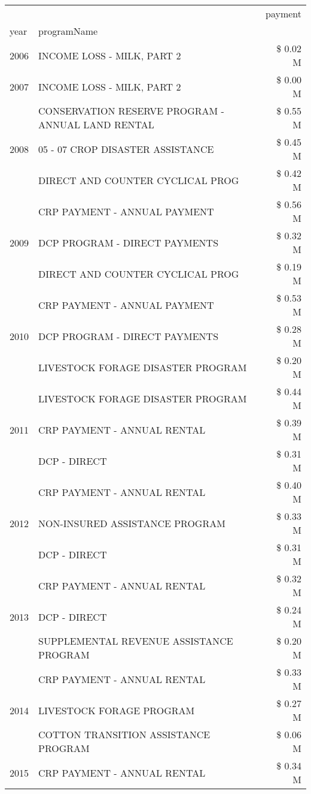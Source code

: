 \begin{tabular}{llr}
\toprule
 &  & payment \\
year & programName &  \\
\midrule
2006 & INCOME LOSS - MILK, PART 2 & \$ 0.02 M \\
\cline{1-3}
2007 & INCOME LOSS - MILK, PART 2 & \$ 0.00 M \\
\cline{1-3}
\multirow[t]{3}{*}{2008} & CONSERVATION RESERVE PROGRAM - ANNUAL LAND RENTAL & \$ 0.55 M \\
 & 05 - 07 CROP DISASTER ASSISTANCE & \$ 0.45 M \\
 & DIRECT AND COUNTER CYCLICAL PROG & \$ 0.42 M \\
\cline{1-3}
\multirow[t]{3}{*}{2009} & CRP PAYMENT - ANNUAL PAYMENT & \$ 0.56 M \\
 & DCP PROGRAM - DIRECT PAYMENTS & \$ 0.32 M \\
 & DIRECT AND COUNTER CYCLICAL PROG & \$ 0.19 M \\
\cline{1-3}
\multirow[t]{3}{*}{2010} & CRP PAYMENT - ANNUAL PAYMENT & \$ 0.53 M \\
 & DCP PROGRAM - DIRECT PAYMENTS & \$ 0.28 M \\
 & LIVESTOCK FORAGE DISASTER  PROGRAM & \$ 0.20 M \\
\cline{1-3}
\multirow[t]{3}{*}{2011} & LIVESTOCK FORAGE DISASTER PROGRAM & \$ 0.44 M \\
 & CRP PAYMENT - ANNUAL RENTAL & \$ 0.39 M \\
 & DCP - DIRECT & \$ 0.31 M \\
\cline{1-3}
\multirow[t]{3}{*}{2012} & CRP PAYMENT - ANNUAL RENTAL & \$ 0.40 M \\
 & NON-INSURED ASSISTANCE PROGRAM & \$ 0.33 M \\
 & DCP - DIRECT & \$ 0.31 M \\
\cline{1-3}
\multirow[t]{3}{*}{2013} & CRP PAYMENT - ANNUAL RENTAL & \$ 0.32 M \\
 & DCP - DIRECT & \$ 0.24 M \\
 & SUPPLEMENTAL REVENUE ASSISTANCE PROGRAM & \$ 0.20 M \\
\cline{1-3}
\multirow[t]{3}{*}{2014} & CRP PAYMENT - ANNUAL RENTAL & \$ 0.33 M \\
 & LIVESTOCK FORAGE PROGRAM & \$ 0.27 M \\
 & COTTON TRANSITION ASSISTANCE PROGRAM & \$ 0.06 M \\
\cline{1-3}
\multirow[t]{3}{*}{2015} & CRP PAYMENT - ANNUAL RENTAL & \$ 0.34 M \\

\end{tabular}
